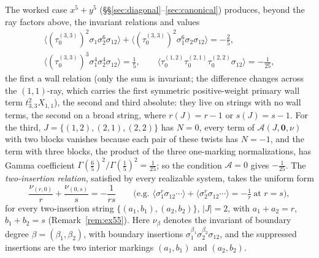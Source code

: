 \documentclass[11pt]{amsart}
\theoremstyle{definition}
\theoremstyle{remark}
\newcommand{\Ascr}{\mathcal{A}}
\begin{document}
The worked case $x^{5}+y^{5}$ (\S\S\ref{sec:diagonal}--\ref{sec:canonical})
produces, beyond the ray factors above, the invariant relations and values
\begin{gather}
\langle(\tau_{0}^{(3,3)})^{2}\sigma_{1}\sigma_{2}^{6}\sigma_{12}\rangle
+\langle(\tau_{0}^{(3,3)})^{2}\sigma_{1}^{6}\sigma_{2}\sigma_{12}\rangle
=-\tfrac25,
\label{eq:firstwallrel}\\
\langle(\tau_{0}^{(3,3)})^{3}
\sigma_{1}^{4}\sigma_{2}^{4}\sigma_{12}\rangle=\tfrac15,\qquad
\langle\tau_{0}^{(1,2)}\tau_{0}^{(2,1)}\tau_{0}^{(2,2)}\sigma_{12}\rangle
=-\tfrac1{25},
\label{eq:newinvariants}
\end{gather}
the first a wall relation (only the sum is invariant; the difference changes
across the $(1,1)$-ray, which carries the first symmetric positive-weight primary wall
term $t_{3,3}^{2}X_{1,1}$), the second and third absolute: they live on
strings with no wall terms, the second on a broad string, where
$r(J)=r-1$ or $s(J)=s-1$.  For the third, $J=\{(1,2),(2,1),(2,2)\}$ has
$N=0$, every term of $\Ascr(J,\mathbf 0,\nu)$ with two blocks vanishes
because each pair of these twists has $N=-1$, and the term with three blocks,
the product of the three one-marking normalizations, has Gamma coefficient
$\Gamma(\tfrac65)^2/\Gamma(\tfrac15)^2=\tfrac1{25}$; so the condition
$\Ascr=0$ gives $-\tfrac1{25}$.  The \emph{two-insertion relation}, satisfied by every realizable system, takes the uniform form
\begin{equation}
\label{eq:seed}
\frac{\nu_{(r,0)}}{r}+\frac{\nu_{(0,s)}}{s}=-\frac1{rs}
\qquad\text{(e.g. }\langle\sigma_{1}^{r}\sigma_{12}\cdots\rangle
+\langle\sigma_{2}^{r}\sigma_{12}\cdots\rangle=-\tfrac1r\ \text{at }r=s),
\end{equation}
for every two-insertion string $\{(a_{1},b_{1}),(a_{2},b_{2})\}$,
$|J|=2$, with $a_{1}+a_{2}=r$, $b_{1}+b_{2}=s$ (Remark~\ref{rem:ex55}). Here
$\nu_{\beta}$ denotes the invariant of boundary degree $\beta=(\beta_1,\beta_2)$,
with boundary insertions $\sigma_{1}^{\beta_{1}}\sigma_{2}^{\beta_{2}}\sigma_{12}$, and
the suppressed
insertions are the two interior markings $(a_1,b_1)$ and $(a_2,b_2)$.
\end{document}
